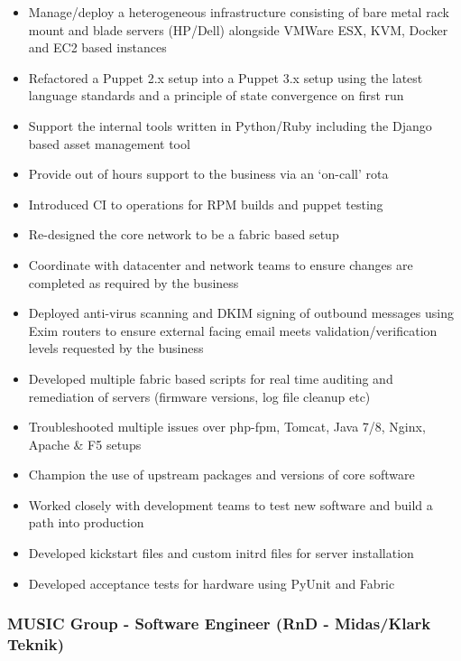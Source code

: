 \begin{itemize}
\itemsep1pt\parskip0pt
\item
  Manage/deploy a heterogeneous infrastructure consisting of bare metal
  rack mount and blade servers (HP/Dell) alongside VMWare ESX, KVM,
  Docker and EC2 based instances
\item
  Refactored a Puppet 2.x setup into a Puppet 3.x setup using the latest
  language standards and a principle of state convergence on first run
\item
  Support the internal tools written in Python/Ruby including the Django
  based asset management tool
\item
  Provide out of hours support to the business via an `on-call' rota
\item
  Introduced CI to operations for RPM builds and puppet testing
\item
  Re-designed the core network to be a fabric based setup
\item
  Coordinate with datacenter and network teams to ensure changes are
  completed as required by the business
\item
  Deployed anti-virus scanning and DKIM signing of outbound messages
  using Exim routers to ensure external facing email meets
  validation/verification levels requested by the business
\item
  Developed multiple fabric based scripts for real time auditing and
  remediation of servers (firmware versions, log file cleanup etc)
\item
  Troubleshooted multiple issues over php-fpm, Tomcat, Java 7/8, Nginx,
  Apache \& F5 setups
\item
  Champion the use of upstream packages and versions of core software
\item
  Worked closely with development teams to test new software and build a
  path into production
\item
  Developed kickstart files and custom initrd files for server
  installation
\item
  Developed acceptance tests for hardware using PyUnit and Fabric
\end{itemize}

\subsubsection{MUSIC Group - Software Engineer (RnD - Midas/Klark
Teknik)}\label{music-group---software-engineer-rnd---midasklark-teknik}

